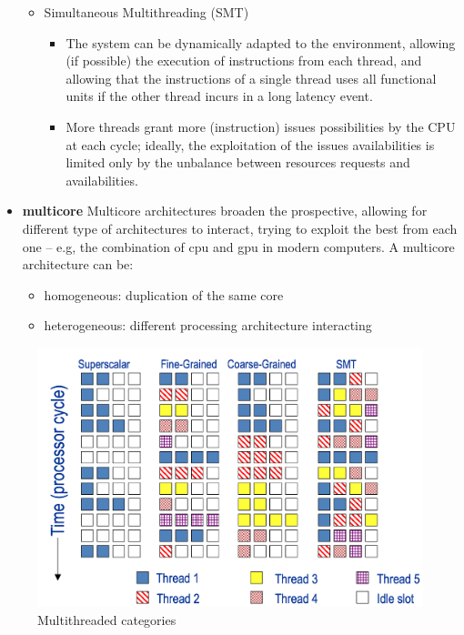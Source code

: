 \begin{itemize}
\begin{itemize}
        \item Simultaneous Multithreading (SMT)
        \begin{itemize}
            \item The system can be dynamically adapted to the environment, allowing (if possible) the execution
            of instructions from each thread, and allowing that the instructions of a single thread uses all
            functional units if the other thread incurs in a long latency event.
            \item More threads grant more (instruction) issues possibilities by the CPU at each cycle;
            ideally, the exploitation of the issues availabilities is limited only by the unbalance between resources
            requests and availabilities.
        \end{itemize}
    \end{itemize}

    \item \textbf{multicore}
    Multicore architectures broaden the prospective, allowing for different type of architectures to interact, trying
    to exploit the best from each one -- e.g, the combination of cpu and gpu in modern computers.
    A multicore architecture can be:
    \begin{itemize}
        \item homogeneous: duplication of the same core
        \item heterogeneous: different processing architecture interacting
    \end{itemize}
\end{itemize}

\begin{figure}[h]
    \centering
    \includegraphics[scale=0.25]{images/multithreaded-categories}
    \caption{Multithreaded categories}
    \label{fig:multithreaded-categories}
\end{figure}

